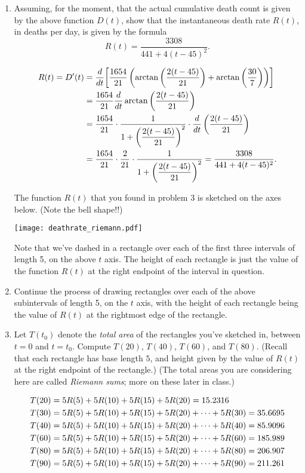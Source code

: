 \documentclass[letterpaper,11pt]{article}
\def\ds{\displaystyle}
\newif\ifsolutions
\newcommand{\sol}[1]{\textcolor{red}{#1}}
\newcommand{\sol}[1]{\textcolor{white}{#1}}
\begin{document}
\begin{enumerate}
\item Assuming, for the moment,  that the actual cumulative death count is given by the above function $D(t)$, show that   the instantaneous death rate $R(t)$, in deaths per day, is given by the formula$$R(t)= \frac{3308}{441+4 (t-45)^2 }.$$ 
 
\sol{$$\aligned R(t)= D'(t)&= \frac{d}{dt}\biggl[\frac{1654}{21} \left(\arctan\left(\frac{2 (t-45)}{21}\right)+\arctan\left(\frac{30}{7}\right)\right)\biggr]\\&= \frac{1654}{21} \frac{d}{dt}  \arctan\left(\frac{2 (t-45)}{21}\right) \\&= \frac{1654}{21} \cdot\frac{1}{1+\ds\biggl(\frac{2 (t-45)}{21}\biggr)^2}\cdot \frac{d}{dt}   \left(\frac{2 (t-45)}{21}\right)   
\\&= \frac{1654}{21} \cdot\frac{2}{21}\cdot\frac{1}{1+\ds\biggl(\frac{2 (t-45)}{21}\biggr)^2}  =  \frac{3308}{441+4 (t-45)^2 }.  \endaligned$$}

\vfill

\newpage

\noindent The function $R(t)$ that you found in problem 3 is sketched on the axes below.  (Note the bell shape!!)

\ifsolutions
\texttt{[image: deathratesol.pdf]}
\else
\texttt{[image: deathrate\_riemann.pdf]}
\fi
 \noindent  Note that we've dashed in a rectangle over each of the first three intervals of length 5, on the above $t$ axis.  The height of each rectangle is just the value of the function $R(t)$ at the right endpoint of the interval in question.

\smallskip

\item  Continue the process of drawing rectangles over each of the above subintervals of length 5, on the $t$ axis, with the height of each rectangle being the value of $R(t)$ at the rightmost edge of the rectangle. 

\item  Let $T(t_0)$ denote the {\it total area} of the rectangles you've sketched in, between $t=0$ and $t=t_0$.  Compute $T(20)$, $T(40)$, $T(60)$, and $T(80)$.  (Recall that each rectangle has base length $5$, and height given by the value of $R(t)$ at the right endpoint of the rectangle.)  (The total areas you are considering here are called {\it Riemann sums}; more on these later in class.)

\sol{$$\aligned T(20)&=5R(5)+5R(10)+5R(15)+5R(20)=15.2316\\
T(30)&=5R(5)+5R(10)+5R(15)+5R(20)+\cdots+5R(30)=35.6695\\
T(40)&=5R(5)+5R(10)+5R(15)+5R(20)+\cdots+5R(40)=85.9096\\
T(60)&=5R(5)+5R(10)+5R(15)+5R(20)+\cdots+5R(60)=185.989\\
T(80)&=5R(5)+5R(10)+5R(15)+5R(20)+\cdots+5R(80)=206.907\\
T(90)&=5R(5)+5R(10)+5R(15)+5R(20)+\cdots+5R(90)=211.261\\
\endaligned$$}


\end{enumerate}
\end{document}
